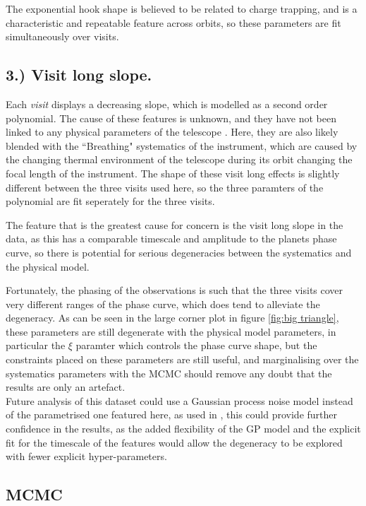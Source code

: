 \documentclass[a4paper,fleqn,usenatbib]{mnras}
\begin{document}
The exponential hook shape is believed to be related to charge trapping, and is a characteristic and repeatable feature across orbits, so these parameters are fit simultaneously over visits.

\subsection*{3.) Visit long slope. }

Each \emph{visit} displays a decreasing slope, which is modelled as a second order polynomial. The cause of these features is unknown, and they have not been linked to any physical parameters of the telescope \cite{Wakeford2016}. Here, they are also likely blended with the ``Breathing" systematics of the instrument, which are caused by the changing thermal environment of the telescope during its orbit changing the focal length of the instrument. The shape of these visit long effects is slightly different between the three visits used here, so the three paramters of the polynomial are fit seperately for the three visits.

The feature that is the greatest cause for concern is the visit long slope in the data, as this has a comparable timescale and amplitude to the planets phase curve, so there is potential for serious degeneracies between the systematics and the physical model.

Fortunately, the phasing of the observations is such that the three visits cover very different ranges of the phase curve, which does tend to alleviate the degeneracy. As can be seen in the large corner plot in figure \ref{fig:big triangle}, these parameters are still degenerate with the physical model parameters, in particular the $\xi$ paramter which controls the phase curve shape, but the constraints placed on these parameters are still useful, and marginalising over the systematics parameters with the MCMC should remove any doubt that the results are only an artefact.\\

Future analysis of this dataset could use a Gaussian process noise model instead of the parametrised one featured here, as used in \citet{Gibson2012a}, this could provide further confidence in the results, as the added flexibility of the GP model and the explicit fit for the timescale of the features would allow the degeneracy to be explored with fewer explicit hyper-parameters.

\subsection{MCMC}\label{sec:MCMC}
\end{document}
